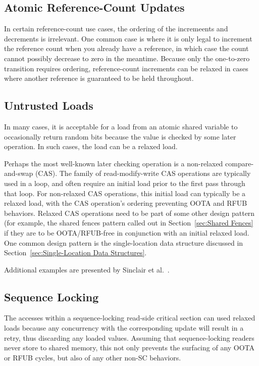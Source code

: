 \documentclass[10]{article}
\begin{document}
\subsection{Atomic Reference-Count Updates}
\label{sec:Atomic Reference-Count Updates}

In certain reference-count use cases, the ordering of the incremeents and
decrements is irrelevant.
One common case is where it is only legal to increment the reference
count when you already have a reference, in which case the count cannot
possibly decrease to zero in the meantime.
Because only the one-to-zero transition requires ordering, reference-count
increments can be relaxed in cases where another reference is guaranteed
to be held throughout.

\subsection{Untrusted Loads}
\label{sec:Untrusted Loads}

In many cases, it is acceptable for a load from an atomic shared variable
to occasionally return random bits because the value is checked by
some later operation.
In such cases, the load can be a relaxed load.

Perhaps the most well-known later checking operation is a non-relaxed
compare-and-swap (CAS).
The  family of read-modify-write
CAS operations are typically used in a loop, and often require an initial
load prior to the first pass through that loop.
For non-relaxed CAS operations, this initial load can typically be a
relaxed load, with the CAS operation's ordering preventing OOTA and RFUB
behaviors.
Relaxed CAS operations need to be part of some other design pattern
(for example, the shared fences pattern called out in
Section~\ref{sec:Shared Fences}
if they are to be OOTA/RFUB-free in conjunction with an initial relaxed
load.
One common design pattern is the single-location data structure discussed in
Section~\ref{sec:Single-Location Data Structures}.

Additional examples are presented by
Sinclair et al.~\cite{Sinclair:2017:CAR:3079856.3080206}.

\subsection{Sequence Locking}
\label{sec:Sequence Locking}

The accesses within a sequence-locking read-side critical section
can used relaxed loads because any concurrency with the corresponding
update will result in a retry, thus discarding any loaded values.
Assuming that sequence-locking readers never store to shared memory,
this not only prevents the surfacing of any OOTA or RFUB cycles, but
also of any other non-SC behaviors.
\end{document}
